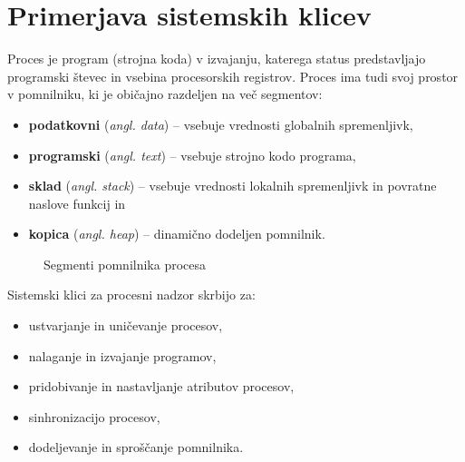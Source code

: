 \documentclass[a4paper,12pt,openright]{book}
\begin{document}
\section{Primerjava sistemskih klicev}

Proces je program (strojna koda) v izvajanju, katerega status predstavljajo programski števec in vsebina procesorskih registrov.
Proces ima tudi svoj prostor v pomnilniku, ki je običajno razdeljen na več segmentov:
\begin{itemize}
	\item \textbf{podatkovni} (\textit{angl. data}) -- vsebuje vrednosti globalnih spremenljivk,
	\item \textbf{programski} (\textit{angl. text}) -- vsebuje strojno kodo programa,
	\item \textbf{sklad} (\textit{angl. stack}) -- vsebuje vrednosti lokalnih spremenljivk in povratne naslove funkcij in
	\item \textbf{kopica} (\textit{angl. heap}) -- dinamično dodeljen pomnilnik.\cite{Silberschatz_Galvin_Gagne_2018}
\end{itemize}

\begin{figure}[h!]
	\begin{center}
	\end{center}
	\caption{Segmenti pomnilnika procesa}
\end{figure}

Sistemski klici za procesni nadzor skrbijo za:
\begin{itemize}
	\item ustvarjanje in uničevanje procesov,
	\item nalaganje in izvajanje programov,
	\item pridobivanje in nastavljanje atributov procesov,
	\item sinhronizacijo procesov,
	\item dodeljevanje in sproščanje pomnilnika.\cite{Silberschatz_Galvin_Gagne_2018}
\end{itemize}
\end{document}

